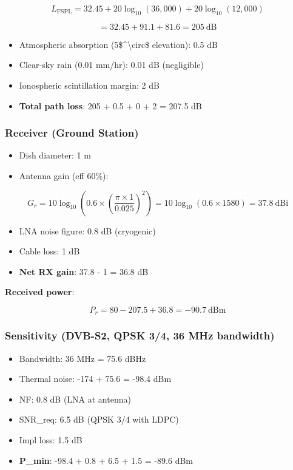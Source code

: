 \[
L_{\text{FSPL}} = 32.45 + 20\log_{10}(36,000) + 20\log_{10}(12,000)
\]

\[
= 32.45 + 91.1 + 81.6 = 205\ \text{dB}
\]

\begin{itemize}
\tightlist
\item
  Atmospheric absorption (5\$\^{}\textbackslash circ\$ elevation): 0.5
  dB
\item
  Clear-sky rain (0.01 mm/hr): 0.01 dB (negligible)
\item
  Ionospheric scintillation margin: 2 dB
\item
  \textbf{Total path loss}: 205 + 0.5 + 0 + 2 = 207.5 dB
\end{itemize}

\subsubsection{Receiver (Ground Station)}\label{receiver-ground-station}

\begin{itemize}
\tightlist
\item
  Dish diameter: 1 m
\item
  Antenna gain (eff 60\%):
\end{itemize}

\[
G_r = 10\log_{10}\left(0.6 \times \left(\frac{\pi \times 1}{0.025}\right)^2\right) = 10\log_{10}(0.6 \times 1580) = 37.8\ \text{dBi}
\]

\begin{itemize}
\tightlist
\item
  LNA noise figure: 0.8 dB (cryogenic)
\item
  Cable loss: 1 dB
\item
  \textbf{Net RX gain}: 37.8 - 1 = 36.8 dB
\end{itemize}

\textbf{Received power}:

\[
P_r = 80 - 207.5 + 36.8 = -90.7\ \text{dBm}
\]

\subsubsection{Sensitivity (DVB-S2, QPSK 3/4, 36 MHz
bandwidth)}\label{sensitivity-dvb-s2-qpsk-34-36-mhz-bandwidth}

\begin{itemize}
\tightlist
\item
  Bandwidth: 36 MHz = 75.6 dBHz
\item
  Thermal noise: -174 + 75.6 = -98.4 dBm
\item
  NF: 0.8 dB (LNA at antenna)
\item
  SNR\_req: 6.5 dB (QPSK 3/4 with LDPC)
\item
  Impl loss: 1.5 dB
\item
  \textbf{P\_min}: -98.4 + 0.8 + 6.5 + 1.5 = -89.6 dBm
\end{itemize}

